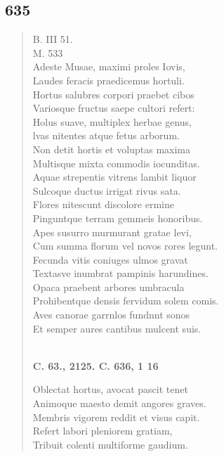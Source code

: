 \documentclass[11pt, a4paper]{report}
\begin{document}
            \subsection*{635}
      \begin{verse}
      B. III 51. \\ M. 533 \\ Adeste Musae, maximi proles Iovis, \\ Laudes feracis praedicemus hortuli. \\ Hortus salubres corpori praebet cibos \\ Variosque fructus saepe cultori refert: \\ Holus suave, multiplex herbae genus, \\ lvas nitentes atque fetus arborum. \\ Non detit hortis et voluptas maxima \\ Multisque mixta commodis iocunditas. \\ Aquae strepentis vitrens lambit liquor \\ Sulcoque ductus irrigat rivus sata. \\ Flores nitescunt discolore ermine \\ Pinguntque terram gemmeis honoribus. \\ Apes susurro murmurant gratae levi, \\ Cum summa florum vel novos rores legunt. \\ Fecunda vitis coniuges ulmos gravat \\ Textasve inumbrat pampinis harundines. \\ Opaca praebent arbores umbracula \\ Prohibentque densis fervidum solem comis. \\ Aves canorae garrnlos fundnnt sonos \\ Et semper aures cantibus mulcent suis. \\ 
        ﻿\pagebreak 
     \marginpar{[102]} \begin{center} \textbf{C. 63., 2125. C. 636, 1 16} \end{center}Oblectat hortus, avocat pascit tenet \\ Animoque maesto demit angores graves. \\ Membris vigorem reddit et visus capit. \\ Refert labori pleniorem gratiam, \\ Tribuit colenti multiforme gaudium. \\ 
      \end{verse}
  
\end{document}
